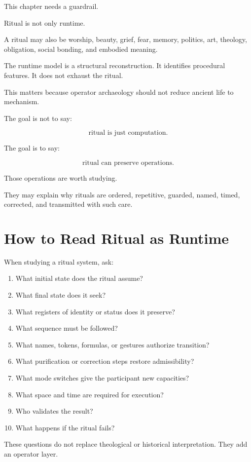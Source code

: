 \documentclass[11pt]{book}
\begin{document}
This chapter needs a guardrail.

Ritual is not only runtime.

A ritual may also be worship, beauty, grief, fear, memory, politics, art, theology, obligation, social bonding, and embodied meaning.

The runtime model is a structural reconstruction. It identifies procedural features. It does not exhaust the ritual.

This matters because operator archaeology should not reduce ancient life to mechanism.

The goal is not to say:

\[
\text{ritual is just computation}.
\]

The goal is to say:

\[
\text{ritual can preserve operations}.
\]

Those operations are worth studying.

They may explain why rituals are ordered, repetitive, guarded, named, timed, corrected, and transmitted with such care.

\section{How to Read Ritual as Runtime}

When studying a ritual system, ask:

\begin{enumerate}[label=\arabic*.]
    \item What initial state does the ritual assume?
    \item What final state does it seek?
    \item What registers of identity or status does it preserve?
    \item What sequence must be followed?
    \item What names, tokens, formulas, or gestures authorize transition?
    \item What purification or correction steps restore admissibility?
    \item What mode switches give the participant new capacities?
    \item What space and time are required for execution?
    \item Who validates the result?
    \item What happens if the ritual fails?
\end{enumerate}

These questions do not replace theological or historical interpretation. They add an operator layer.
\end{document}
